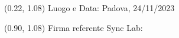 \documentclass{article}
\begin{document}
\begin{textblock*}{\textwidth}(0.22\textwidth, 1.08\textheight)
    Luogo e Data: Padova, 24/11/2023
\end{textblock*}

\begin{textblock*}{\textwidth}(0.90\textwidth, 1.08\textheight)
        Firma referente Sync Lab:
\end{textblock*}
\end{document}
